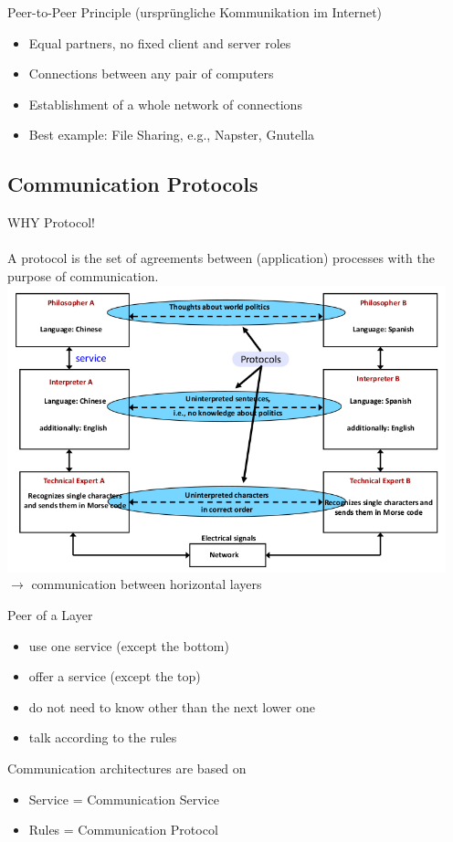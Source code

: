 \documentclass[11pt,ngerman]{article}
\begin{document}
Peer-to-Peer	Principle (ursprüngliche Kommunikation im Internet)
\begin{itemize}
	\item Equal	partners,	no	fixed	client	and	server	roles
	\item Connections	between	any	pair	of	computers
	\item Establishment	of	a	whole	network	of	connections
	\item Best	example:	File	Sharing,	e.g.,	Napster,	Gnutella
\end{itemize}

\subsection{Communication	Protocols}
WHY Protocol!	
\\\\
A	protocol	is	the	set	of	agreements	between	(application)	processes	with	the	purpose	of	
communication.\\
	\includegraphics[width=5in]{images/Selection_006.png}\\
	$\rightarrow$ communication between horizontal layers
	
Peer	of	a	Layer
\begin{itemize}
\item
use	one	service	
(except	the	bottom)
\item
offer	a	service	
(except	the	top)
\item
do	not	need	to	know	other	
than	the	next	lower	one
\item
talk	according	to	the	rules
\end{itemize}

Communication	architectures	are	based	on
\begin{itemize}
\item  Service	=	Communication	Service
\item Rules	=	Communication	Protocol

\end{itemize}
\end{document}

